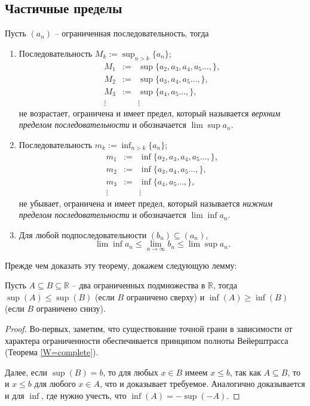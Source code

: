 \subsection{Частичные пределы}


\begin{theorem}\label{from_bounded_sequence}
    Пусть $(a_n)$ -- ограниченная последовательность, тогда
    \begin{enumerate}
        \item Последовательность $M_k:=\sup_{n>k}\{a_n\}$;
        \[
         \begin{matrix}
             M_1 & := & \sup \{a_2, a_3, a_4,a_5 \ldots,\},\\
             M_2 & := & \sup \{a_3, a_4,a_5 \ldots,\},\\
             M_3 & := & \sup \{a_4,a_5 \ldots,\},\\
             \vdots && \vdots
         \end{matrix}
        \]
        не возрастает, ограничена и имеет предел, который называется \textit{верхним пределом последовательности} и обозначается $\lim \sup a_n$.

        \item Последовательность $m_k:=\inf_{n>k}\{a_n\}$;
         \[
         \begin{matrix}
             m_1 & := & \inf \{a_2, a_3, a_4,a_5 \ldots,\},\\
             m_2 & := & \inf \{a_3, a_4,a_5 \ldots,\},\\
             m_3 & := & \inf \{ a_4,a_5 \ldots,\},\\
             \vdots && \vdots
         \end{matrix}
        \]
        не убывает, ограничена и имеет предел, который называется \textit{нижним пределом последовательности} и обозначается $\lim \inf a_n$.

        \item Для любой подпоследовательности $ (b_n ) \subseteq  (a_n )$,
        \[
         \lim \inf a_n \le \lim_{n \to \infty } b_n \le \lim \sup a_n.
        \]

    \end{enumerate}
\end{theorem}

Прежде чем доказать эту теорему, докажем следующую лемму:

\begin{lemma}\label{A<B=sup(A)<sup(B)}
    Пусть $A \subseteq B \subseteq \mathbb{R}$ -- два ограниченных подмножества в $\mathbb{R}$, тогда $\sup(A) \le \sup(B)$ (если $B$ ограничено сверху) и $\inf(A) \ge \inf(B)$ (если $B$ ограничено снизу).
\end{lemma}
\begin{proof}
    Во-первых, заметим, что существование точной грани в зависимости от характера ограниченности обеспечивается принципом полноты Вейерштрасса (Теорема \ref{W=complete}).

    Далее, если $\sup(B) = b$, то для любых $x \in B$ имеем $x \le b$, так как $A \subseteq B$, то и $x \le b$ для любого $x \in A$, что и доказывает требуемое. Аналогично доказывается и для $\inf$, где нужно учесть, что $\inf(A) = -\sup (-A)$.
\end{proof}

